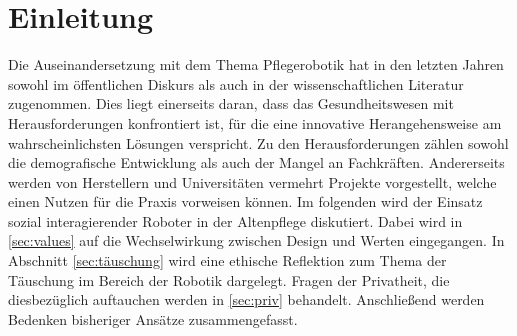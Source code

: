 \chapter{Einleitung}
\label{ch:einleitung}
Die Auseinandersetzung mit dem Thema Pflegerobotik hat in den letzten Jahren sowohl im öffentlichen Diskurs als auch in der wissenschaftlichen Literatur zugenommen. Dies liegt einerseits daran, dass das Gesundheitswesen mit Herausforderungen konfrontiert ist, für die eine innovative Herangehensweise am wahrscheinlichsten Lösungen verspricht. Zu den Herausforderungen zählen sowohl die demografische Entwicklung als auch der Mangel an Fachkräften. Andererseits werden von Herstellern und Universitäten vermehrt Projekte vorgestellt, welche einen Nutzen für die Praxis vorweisen können. Im folgenden wird der Einsatz sozial interagierender Roboter in der Altenpflege diskutiert. Dabei wird in \ref{sec:values} auf die Wechselwirkung zwischen Design und Werten eingegangen. In Abschnitt \ref{sec:täuschung} wird eine ethische Reflektion zum Thema der Täuschung im Bereich der Robotik dargelegt. Fragen der Privatheit, die diesbezüglich auftauchen werden in \ref{sec:priv} behandelt. Anschließend werden Bedenken bisheriger Ansätze zusammengefasst.



